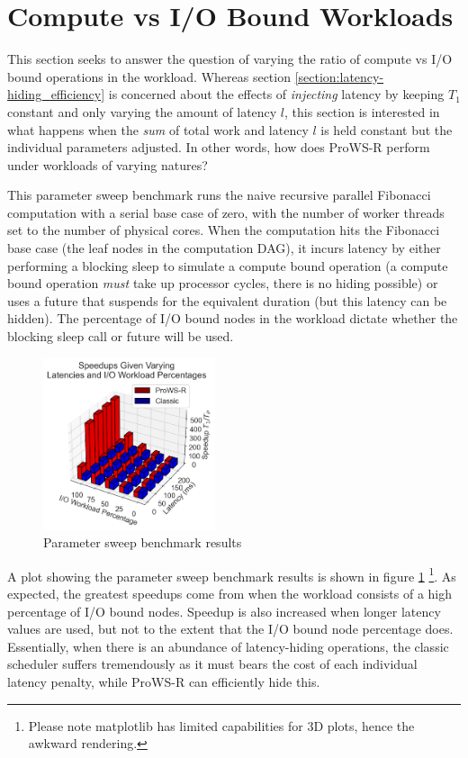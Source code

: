 \documentclass[bsc,frontabs,singlespacing,parskip,deptreport,normalheadings]{infthesis}
\begin{document}
\section{Compute vs I/O Bound Workloads}
\label{section:compute_vs_i/o_bound_workloads}

This section seeks to answer the question of varying the ratio of compute vs I/O
bound operations in the workload. Whereas section
\ref{section:latency-hiding_efficiency} is concerned about the effects of
\textit{injecting} latency by keeping \(T_1\) constant and only varying the
amount of latency \(l\), this section is interested in what
happens when the \textit{sum} of total work and latency \(l\) is held constant
but the individual parameters adjusted. In other words, how does ProWS-R perform
under workloads of varying natures?

This parameter sweep benchmark runs the naive recursive parallel Fibonacci
computation with a serial base case of zero, with the number of worker threads
set to the number of physical cores. When the computation hits the Fibonacci
base case (the leaf nodes in the computation DAG), it incurs latency by either
performing a blocking sleep to simulate a compute bound operation (a compute
bound operation \textit{must} take up processor cycles, there is no hiding
possible) or uses a future that suspends for the equivalent duration (but this
latency can be hidden). The percentage of I/O bound nodes in the workload
dictate whether the blocking sleep call or future will be used.

\begin{figure}[ht]
    \centering
    \includegraphics[width=0.45\textwidth]{figures/param_sweep_plot.png}
    \caption{Parameter sweep benchmark results}
    \label{fig:param_sweep}
\end{figure}

A plot showing the parameter sweep benchmark results is shown in figure
\ref{fig:param_sweep} \footnote{Please note matplotlib has limited capabilities
for 3D plots, hence the awkward rendering.}. As expected, the greatest speedups come from when the
workload consists of a high percentage of I/O bound nodes. Speedup is also
increased when longer latency values are used, but not to the extent that the
I/O bound node percentage does. Essentially, when there is an abundance of
latency-hiding operations, the classic scheduler suffers tremendously as it must
bears the cost of each individual latency penalty, while ProWS-R can efficiently
hide this.
\end{document}
